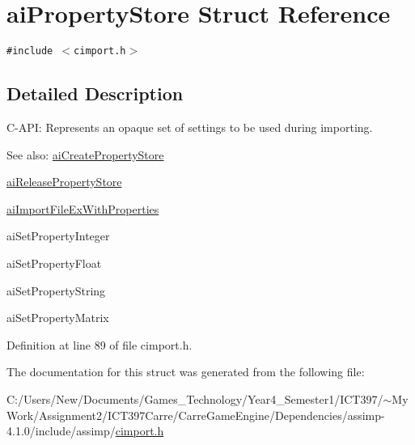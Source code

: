\hypertarget{structai_property_store}{
\section{aiPropertyStore Struct Reference}
\label{structai_property_store}
}
{\tt \#include $<$cimport.h$>$}



\subsection{Detailed Description}
C-API: Represents an opaque set of settings to be used during importing. \begin{Desc}
\item[See also:]\hyperlink{cimport_8h_523d3d8b510203fb1a80d8702283f8c9}{aiCreatePropertyStore} 

\hyperlink{cimport_8h_579dddd75dbba5621c235df780ffc3e6}{aiReleasePropertyStore} 

\hyperlink{cimport_8h_9ec6845e46be4043cedb579bb85fcc0c}{aiImportFileExWithProperties} 

aiSetPropertyInteger 

aiSetPropertyFloat 

aiSetPropertyString 

aiSetPropertyMatrix \end{Desc}


Definition at line 89 of file cimport.h.

The documentation for this struct was generated from the following file:\begin{CompactItemize}
\item 
C:/Users/New/Documents/Games\_\-Technology/Year4\_\-Semester1/ICT397/$\sim$My Work/Assignment2/ICT397Carre/CarreGameEngine/Dependencies/assimp-4.1.0/include/assimp/\hyperlink{cimport_8h}{cimport.h}\end{CompactItemize}
